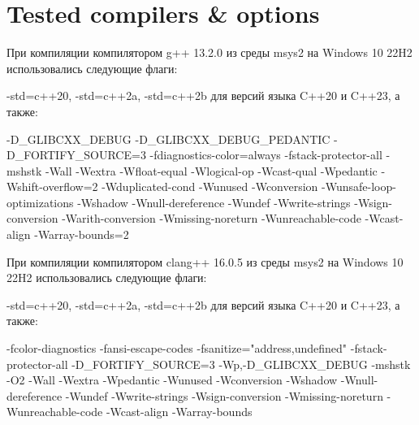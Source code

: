 \documentclass{report}
\begin{document}
\pagebreak

\section*{Tested compilers \& options}

При компиляции компилятором g++ 13.2.0 из среды msys2 на Windows 10 22H2 использовались следующие флаги:

-std=c++20, -std=c++2a, -std=c++2b для версий языка C++20 и C++23, а также:

\begin{cppcode}
-D_GLIBCXX_DEBUG
-D_GLIBCXX_DEBUG_PEDANTIC
-D_FORTIFY_SOURCE=3
-fdiagnostics-color=always
-fstack-protector-all
-mshstk
-Wall
-Wextra
-Wfloat-equal
-Wlogical-op
-Wcast-qual
-Wpedantic
-Wshift-overflow=2
-Wduplicated-cond
-Wunused -Wconversion
-Wunsafe-loop-optimizations
-Wshadow
-Wnull-dereference
-Wundef 
-Wwrite-strings
-Wsign-conversion
-Warith-conversion
-Wmissing-noreturn
-Wunreachable-code
-Wcast-align
-Warray-bounds=2
\end{cppcode}

При компиляции компилятором clang++ 16.0.5 из среды msys2 на Windows 10 22H2 использовались следующие флаги:

-std=c++20, -std=c++2a, -std=c++2b для версий языка C++20 и C++23, а также:

\begin{cppcode}
-fcolor-diagnostics
-fansi-escape-codes
-fsanitize="address,undefined"
-fstack-protector-all
-D_FORTIFY_SOURCE=3
-Wp,-D_GLIBCXX_DEBUG
-mshstk
-O2
-Wall
-Wextra
-Wpedantic
-Wunused
-Wconversion
-Wshadow
-Wnull-dereference
-Wundef
-Wwrite-strings
-Wsign-conversion
-Wmissing-noreturn
-Wunreachable-code
-Wcast-align
-Warray-bounds
\end{cppcode}
\end{document}

